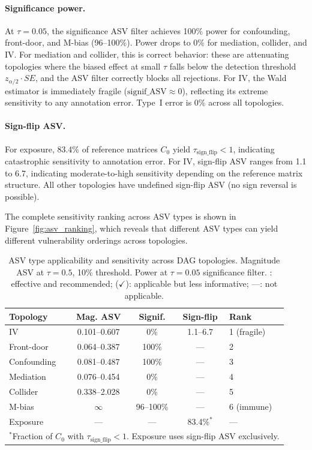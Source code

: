\paragraph{Significance power.}
At $\tau{=}0.05$, the significance ASV filter achieves 100\% power for confounding, front-door, and M-bias (96--100\%). Power drops to 0\% for mediation, collider, and IV. For mediation and collider, this is correct behavior: these are attenuating topologies where the biased effect at small $\tau$ falls below the detection threshold $z_{\alpha/2} \cdot SE$, and the ASV filter correctly blocks all rejections. For IV, the Wald estimator is immediately fragile ($\text{signif\_ASV} \approx 0$), reflecting its extreme sensitivity to any annotation error. Type~I error is 0\% across all topologies.

\paragraph{Sign-flip ASV.}
For exposure, 83.4\% of reference matrices $C_0$ yield $\tau_{\text{sign\_flip}} < 1$, indicating catastrophic sensitivity to annotation error. For IV, sign-flip ASV ranges from 1.1 to 6.7, indicating moderate-to-high sensitivity depending on the reference matrix structure. All other topologies have undefined sign-flip ASV (no sign reversal is possible).

The complete sensitivity ranking across ASV types is shown in Figure~\ref{fig:asv_ranking}, which reveals that different ASV types can yield different vulnerability orderings across topologies.

\begin{table}[t]
\centering
\caption{ASV type applicability and sensitivity across DAG topologies. Magnitude ASV at $\tau{=}0.5$, 10\% threshold. Power at $\tau{=}0.05$ significance filter. \checkmark: effective and recommended; ($\checkmark$): applicable but less informative; ---: not applicable.}
\label{tab:asv_grid}
\small
\begin{tabular}{lcccl}
\toprule
\textbf{Topology} & \textbf{Mag. ASV} & \textbf{Signif.} & \textbf{Sign-flip} & \textbf{Rank} \\
\midrule
IV & 0.101--0.607 & 0\% & 1.1--6.7 & 1 (fragile) \\
Front-door & 0.064--0.387 & 100\% & --- & 2 \\
Confounding & 0.081--0.487 & 100\% & --- & 3 \\
Mediation & 0.076--0.454 & 0\% & --- & 4 \\
Collider & 0.338--2.028 & 0\% & --- & 5 \\
M-bias & $\infty$ & 96--100\% & --- & 6 (immune) \\
Exposure & --- & --- & 83.4\%$^*$ & --- \\
\bottomrule
\multicolumn{5}{l}{\scriptsize $^*$Fraction of $C_0$ with $\tau_{\text{sign\_flip}} < 1$. Exposure uses sign-flip ASV exclusively.}
\end{tabular}
\end{table}

